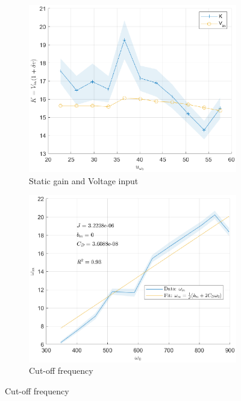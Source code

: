\begin{figure}[H]
    \centering
    \begin{minipage}{0.49\textwidth}
        \begin{figure}[H]
            \includegraphics[width = \textwidth]{./figs/small_perturbation/K-Vin.eps}
            \caption{Static gain and Voltage input}
        \end{figure}
    \end{minipage}
    \begin{minipage}{0.49\textwidth}
        \begin{figure}[H]
            \includegraphics[width = \textwidth]{./figs/small_perturbation/omega_fit.eps}
            \caption{Cut-off frequency}
        \end{figure}
    \end{minipage}
\end{figure}


